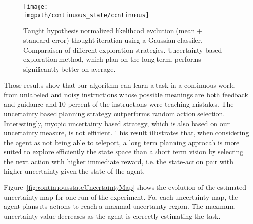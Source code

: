\begin{figure}[!ht]
  \centering
  \texttt{[image: \\imgpath/continuous\_state/continuous]}
  \caption{Taught hypothesis normalized likelihood evolution (mean + standard error) thought iteration using a Gaussian classifer. Comparaison of different exploration strategies. Uncertainty based exploration method, which plan on the long term, performs significantly better on average.}
  \label{fig:continuousstateRmax}
\end{figure}

Those results show that our algorithm can learn a task in a continuous world from unlabeled and noisy instructions whose possible meanings are both feedback and guidance and 10 percent of the instructions were teaching mistakes. The uncertainty based planning strategy outperforms random action selection. Interestingly, myopic uncertainty based strategy, which is also based on our uncertainty measure, is not efficient. This result illustrates that, when considering the agent as not being able to teleport, a long term planning approcah is more suited to explore efficiently the state space than a short term vision by selecting the next action with higher immediate reward, i.e. the state-action pair with higher uncertainty given the state of the agent. 


Figure~\ref{fig:continuousstateUncertaintyMap} shows the evolution of the estimated uncertainty map for one run of the experiment. For each uncertainty map, the agent plans its actions to reach a maximal uncertainty region. The maximum uncertainty value decreases as the agent is correctly estimating the task.

